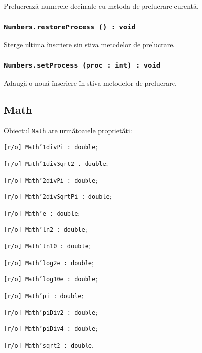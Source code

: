 Prelucrează numerele decimale cu metoda de prelucrare curentă.

\subsubsection{\texttt{Numbers.restoreProcess () : void}}

Șterge ultima înscriere sin stiva metodelor de prelucrare.

\subsubsection{\texttt{Numbers.setProcess (proc : int) : void}}

Adaugă o nouă înscriere în stiva metodelor de prelucrare.

\subsection{Math}

Obiectul \texttt{Math} are următoarele proprietăți:
\begin{icItems}
	\item \texttt{[r/o] Math'1divPi : double};
	\item \texttt{[r/o] Math'1divSqrt2 : double};
	\item \texttt{[r/o] Math'2divPi : double};
	\item \texttt{[r/o] Math'2divSqrtPi : double};
	\item \texttt{[r/o] Math'e : double};
	\item \texttt{[r/o] Math'ln2 : double};
	\item \texttt{[r/o] Math'ln10 : double};
	\item \texttt{[r/o] Math'log2e : double};
	\item \texttt{[r/o] Math'log10e : double};
	\item \texttt{[r/o] Math'pi : double};
	\item \texttt{[r/o] Math'piDiv2 : double};
	\item \texttt{[r/o] Math'piDiv4 : double};
	\item \texttt{[r/o] Math'sqrt2 : double}.
\end{icItems}

